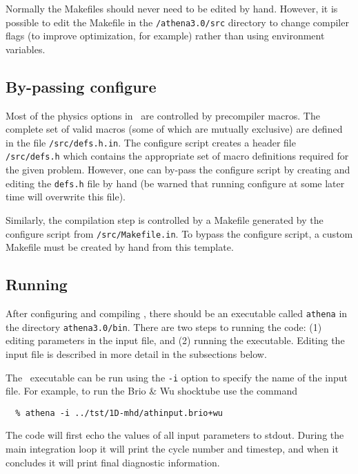Normally the Makefiles should never need to be edited by hand.  However,
it is possible to edit the Makefile in the {\tt /athena3.0/src} directory to
change compiler flags (to improve optimization, for example) rather than using
environment variables.

\subsection{By-passing configure}

Most of the physics options in \ath\ are controlled by precompiler macros.  The
complete set of valid macros (some of which are mutually exclusive) are
defined in the file {\tt /src/defs.h.in}.  
The configure script creates a header file {\tt /src/defs.h} which contains
the appropriate set of macro definitions required for the given problem.
However, one can by-pass the configure script by creating and editing the
{\tt defs.h} file by hand (be warned that running configure at some later time
will overwrite this file).

Similarly, the compilation step is controlled by a Makefile generated by
the configure script from {\tt /src/Makefile.in}.  To bypass the configure
script, a custom Makefile must be created by hand from this template.

\subsection{Running \ath}

After configuring and compiling \ath, there should be an executable
called {\tt athena} in the directory {\tt athena3.0/bin}.  There
are two steps to running the code: (1) editing parameters in the
input file, and (2) running the executable.  Editing the input file is 
described in more detail in the subsections below.

The \ath\ executable can be run using the {\tt -i} option to specify the name of
the input file.  For example, to run the Brio \& Wu shocktube use
the command
\footnotesize
\begin{verbatim}
  % athena -i ../tst/1D-mhd/athinput.brio+wu
\end{verbatim}
\normalsize
The code will first echo the values of all input parameters to stdout.
During the main integration loop
it will print the cycle number and timestep, and
when it concludes it will print final diagnostic information.

